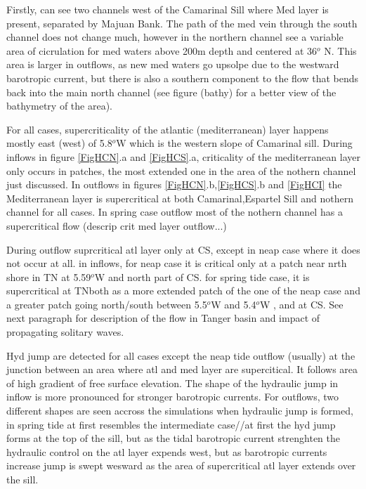 Firstly, can see two channels west of the Camarinal Sill where Med layer is present, separated by Majuan Bank. The path of the med vein through the south channel does not change much, however in the northern channel see a variable area of cicrulation for med waters above 200m depth and centered at 36$^o$ N. This area is larger in outflows, as new med waters go upsolpe due to the westward barotropic current, but there is also a southern component to the flow that bends back into the main north channel (see figure (bathy) for a better view of the bathymetry of the area).

For all cases, supercriticality of the atlantic (mediterranean) layer happens mostly east (west) of 5.8$^o$W which is the western slope of Camarinal sill. During inflows in figure \ref{FigHCN}.a and \ref{FigHCS}.a, criticality of the mediterranean layer only occurs in patches, the most extended one in the area of the nothern channel just discussed. In outflows in figures \ref{FigHCN}.b,\ref{FigHCS}.b and \ref{FigHCI} the Mediterranean layer is supercritical at both Camarinal,Espartel Sill and nothern channel for all cases. In spring case outflow most of the nothern channel has a supercritical flow (descrip crit med layer outflow...)


During outflow suprcritical atl layer only at CS, except in neap case where it does not occur at all. in inflows, for neap case it is critical only at a patch near nrth shore in TN at 5.59$^o$W and north part of CS. for spring tide case, it is supercritical at TNboth as a more extended patch of the one of the neap case and a greater patch going north/south between 5.5$^o$W and 5.4$^o$W , and at CS. See next paragraph for description of the flow in Tanger basin and impact of propagating solitary waves.

Hyd jump are detected for all cases except the neap tide outflow (usually) at the junction between an area where atl and med layer are supercitical. It follows area of high gradient of free surface elevation. The shape of the hydraulic jump in inflow is more pronounced for stronger barotropic currents. For outflows, two different shapes are seen accross the simulations when hydraulic jump is formed, in spring tide at first resembles the intermediate case//at first the hyd jump forms at the top of the sill, but as the tidal barotropic current strenghten the hydraulic control on the atl layer expends west, but as barotropic currents increase jump is swept wesward as the area of supercritical atl layer extends over the sill. 


